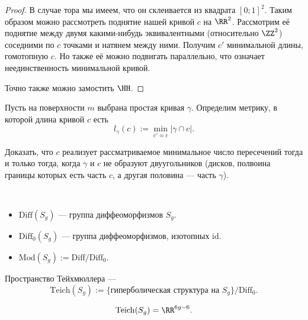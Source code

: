 \documentclass[12pt,a4paper]{article}
\newcommand{\Diff}{\mathrm{Diff}}
\newcommand{\id}{\mathrm{id}}
\newcommand{\Mod}{\mathrm{Mod}}
\newcommand{\Teich}{\mathrm{Teich}}
\begin{document}
    \begin{proof}
        В случае тора мы имеем, что он склеивается из квадрата $[0; 1]^2$. Таким образом можно рассмотреть поднятие нашей кривой $c$ на $\RR^2$. Рассмотрим её поднятие между двумя какими-нибудь эквивалентными (относительно $\ZZ^2$) соседними по $c$ точками и натянем между ними. Получим $c'$ минимальной длины, гомотопную $c$. Но также её можно подвигать параллельно, что означает неединственность минимальной кривой.

        Точно также можно замостить $\HH$.
    \end{proof}

    \begin{problem}
        Пусть на поверхности $m$ выбрана простая кривая $\gamma$. Определим метрику, в которой длина кривой $c$ есть
        \[l_\gamma(c) := \min_{c' \approx c} |\gamma \cap c|.\]

        Доказать, что $c$ реализует рассматриваемое минимальное число пересечений тогда и только тогда, когда $\gamma$ и $c$ не образуют двуугольников (дисков, полвоина границы которых есть часть $c$, а другая половина --- часть $\gamma$).
    \end{problem}

    \begin{definition}\ 
        \begin{itemize}
            \item $\Diff(S_g)$ --- группа диффеоморфизмов $S_g$.
            \item $\Diff_0(S_g)$ --- группа диффеоморфизмов, изотопных $\id$.
            \item $\Mod(S_g) := \Diff / \Diff_0$.
        \end{itemize}
    \end{definition}

    \begin{definition}
        Пространство Тейхмюллера ---
        \[\Teich(S_g) := \{\text{гиперболическая структура на $S_g$}\} / \Diff_0.\]
    \end{definition}

    \begin{theorem}
        \[\Teich(S_g) = \RR^{6g-6}.\]
    \end{theorem}
\end{document}
